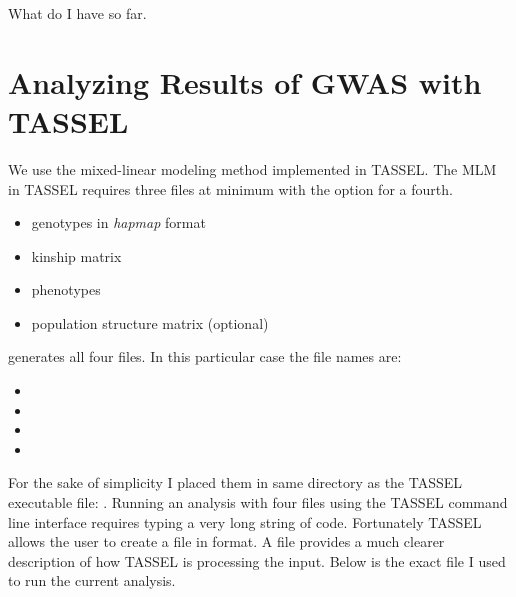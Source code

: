 \documentclass[letterpaper,10pt,english]{sphinxmanual}
\begin{document}
What do I have so far.


\chapter{Analyzing Results of GWAS with TASSEL}
\label{analyzing_magic1478_results:analyze-magic1478-rdm-mating-results}\label{analyzing_magic1478_results:analyzing-results-of-gwas-with-tassel}\label{analyzing_magic1478_results::doc}
We use the mixed-linear modeling method implemented in TASSEL.
The MLM in TASSEL requires three files at minimum with the option for a fourth.
\begin{itemize}
\item {} 
genotypes in \emph{hapmap} format

\item {} 
kinship matrix

\item {} 
phenotypes

\item {} 
population structure matrix (optional)

\end{itemize}

 generates all four files. In this particular case the file names
are:
\begin{itemize}
\item {} 

\item {} 

\item {} 

\item {} 

\end{itemize}

For the sake of simplicity I placed them in same directory as the
TASSEL executable file: . Running an analysis
with four files using the TASSEL command line interface requires typing
a very long string of code. Fortunately TASSEL allows the user to create
a  file in  format. A  file provides a much clearer
description of how TASSEL is processing the input. Below is the exact file I used
to run the current analysis.
\end{document}
